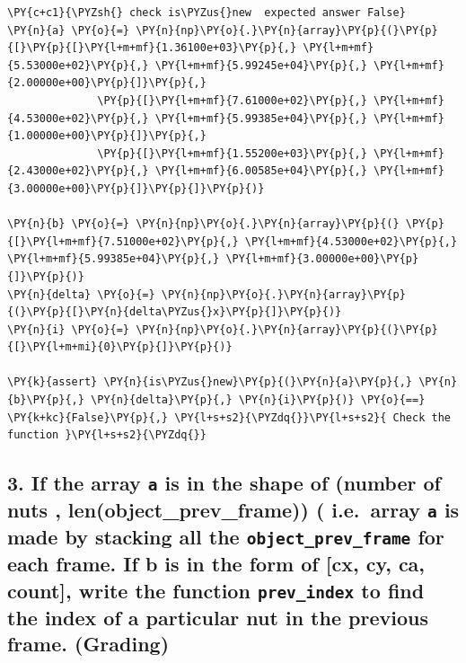 \documentclass[a4paper,11pt]{article}%
\begin{document}
    \begin{tcolorbox}[breakable, size=fbox, boxrule=1pt, pad at break*=1mm,colback=cellbackground, colframe=cellborder]
\begin{Verbatim}[commandchars=\\\{\}]
\PY{c+c1}{\PYZsh{} check is\PYZus{}new  expected answer False}
\PY{n}{a} \PY{o}{=} \PY{n}{np}\PY{o}{.}\PY{n}{array}\PY{p}{(}\PY{p}{[}\PY{p}{[}\PY{l+m+mf}{1.36100e+03}\PY{p}{,} \PY{l+m+mf}{5.53000e+02}\PY{p}{,} \PY{l+m+mf}{5.99245e+04}\PY{p}{,} \PY{l+m+mf}{2.00000e+00}\PY{p}{]}\PY{p}{,}
              \PY{p}{[}\PY{l+m+mf}{7.61000e+02}\PY{p}{,} \PY{l+m+mf}{4.53000e+02}\PY{p}{,} \PY{l+m+mf}{5.99385e+04}\PY{p}{,} \PY{l+m+mf}{1.00000e+00}\PY{p}{]}\PY{p}{,}
              \PY{p}{[}\PY{l+m+mf}{1.55200e+03}\PY{p}{,} \PY{l+m+mf}{2.43000e+02}\PY{p}{,} \PY{l+m+mf}{6.00585e+04}\PY{p}{,} \PY{l+m+mf}{3.00000e+00}\PY{p}{]}\PY{p}{]}\PY{p}{)}

\PY{n}{b} \PY{o}{=} \PY{n}{np}\PY{o}{.}\PY{n}{array}\PY{p}{(} \PY{p}{[}\PY{l+m+mf}{7.51000e+02}\PY{p}{,} \PY{l+m+mf}{4.53000e+02}\PY{p}{,} \PY{l+m+mf}{5.99385e+04}\PY{p}{,} \PY{l+m+mf}{3.00000e+00}\PY{p}{]}\PY{p}{)}
\PY{n}{delta} \PY{o}{=} \PY{n}{np}\PY{o}{.}\PY{n}{array}\PY{p}{(}\PY{p}{[}\PY{n}{delta\PYZus{}x}\PY{p}{]}\PY{p}{)}
\PY{n}{i} \PY{o}{=} \PY{n}{np}\PY{o}{.}\PY{n}{array}\PY{p}{(}\PY{p}{[}\PY{l+m+mi}{0}\PY{p}{]}\PY{p}{)}

\PY{k}{assert} \PY{n}{is\PYZus{}new}\PY{p}{(}\PY{n}{a}\PY{p}{,} \PY{n}{b}\PY{p}{,} \PY{n}{delta}\PY{p}{,} \PY{n}{i}\PY{p}{)} \PY{o}{==} \PY{k+kc}{False}\PY{p}{,} \PY{l+s+s2}{\PYZdq{}}\PY{l+s+s2}{ Check the function }\PY{l+s+s2}{\PYZdq{}}
\end{Verbatim}
\end{tcolorbox}

    \hypertarget{if-the-array-a-is-in-the-shape-of-number-of-nuts-lenobject_prev_frame-i.e.-array-a-is-made-by-stacking-all-the-object_prev_frame-for-each-frame.-if-b-is-in-the-form-of-cx-cy-ca-count-write-the-function-prev_index-to-find-the-index-of-a-particular-nut-in-the-previous-frame.-grading}{%
\subsection{\texorpdfstring{3. If the array \texttt{a} is in the
shape of (number of nuts , len(object\_prev\_frame)) ( i.e.~array
\texttt{a} is made by stacking all the \texttt{object\_prev\_frame} for
each frame. If b is in the form of {[}cx, cy, ca, count{]}, write the
function \texttt{prev\_index} to find the index of a particular nut in
the previous frame.
(Grading)}{3. If the array a is in the shape of (number of nuts , len(object\_prev\_frame)) ( i.e.~array a is made by stacking all the object\_prev\_frame for each frame. If b is in the form of {[}cx, cy, ca, count{]}, write the function prev\_index to find the index of a particular nut in the previous frame. (Grading)}}\label{if-the-array-a-is-in-the-shape-of-number-of-nuts-lenobject_prev_frame-i.e.-array-a-is-made-by-stacking-all-the-object_prev_frame-for-each-frame.-if-b-is-in-the-form-of-cx-cy-ca-count-write-the-function-prev_index-to-find-the-index-of-a-particular-nut-in-the-previous-frame.-grading}}
\end{document}
